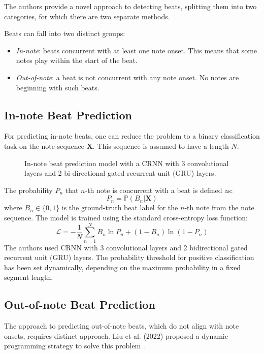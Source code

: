 The authors provide a novel approach to detecting beats, splitting them into two categories, for which there are two separate methods.

Beats can fall into two distinct groups:
\begin{itemize}
	\item \emph{In-note}: beats concurrent with at least one note onset. This means that some notes play within the start of the beat.
	\item \emph{Out-of-note}: a beat is not concurrent with any note onset. No notes are beginning with such beats.
\end{itemize}

\subsection{In-note Beat Prediction}

For predicting in-note beats, one can reduce the problem to a binary classification task on the note sequence $\mathbf{X}$. This sequence is assumed to have a length $N$.

\begin{figure}[!ht]
\centering

\caption[In-note beat prediction model.]{In-note beat prediction model with a CRNN with 3 convolutional layers and 2 bi-directional gated recurrent unit (GRU) layers.}
\end{figure}

The probability $P_n$ that $n$-th note is concurrent with a beat is defined as: \[P_n = \mathbb{P}\left(B_n|\mathbf{X}\right)\] where $B_n\in\{0,1\}$ is the ground-truth beat label for the $n$-th note from the note sequence. The model is trained using the standard cross-entropy loss function: \[\mathcal{L}=-\frac{1}{N}\sum_{n=1}^N B_n\ln P_n + \left(1-B_n\right)\ln\left(1-P_n\right)\] The authors used CRNN with 3 convolutional layers and 2 bidirectional gated recurrent unit (GRU) layers. The probability threshold for positive classification has been set dynamically, depending on the maximum probability in a fixed segment length.

\subsection{Out-of-note Beat Prediction}

The approach to predicting out-of-note beats, which do not align with note onsets, requires distinct approach. Liu et al. (2022) proposed a dynamic programming strategy to solve this problem \cite{Liu2022}.

